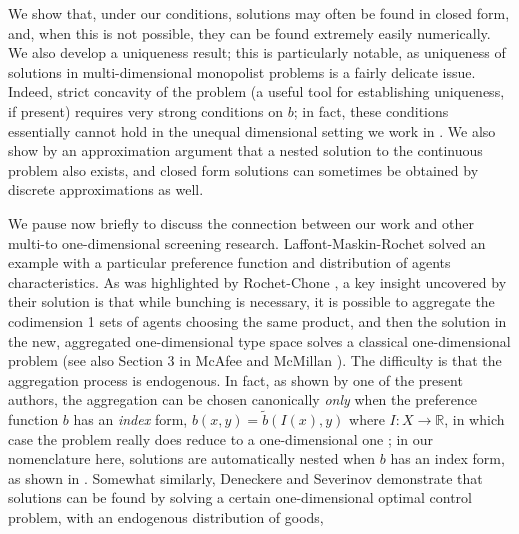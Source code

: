 \documentclass[12pt,reqno]{amsart}
\begin{document}
We show that, under our conditions, solutions may often be found in closed form, and, when this is not possible, they can be found extremely easily numerically.  We also develop a uniqueness result; this is particularly notable, as  uniqueness of solutions in multi-dimensional monopolist problems is a fairly delicate issue. Indeed, strict concavity of the problem (a useful tool for establishing uniqueness, if present) requires very strong conditions on $b$; in fact, these conditions essentially cannot hold in the unequal dimensional setting we work in \cite{Pass2012}.  We also show by an approximation argument that a nested solution to the continuous problem also exists, and closed form solutions can sometimes be obtained by discrete approximations as well.

We pause now briefly to discuss the connection between our work and other multi-to one-dimensional screening research.  Laffont-Maskin-Rochet \cite{laffont} solved an example with a particular preference function and distribution of agents characteristics. %
As was highlighted by Rochet-Chone \cite{RochetChone98}, a key insight uncovered by their solution is that while bunching is necessary, it is possible to aggregate the codimension 1 sets of agents choosing the same product, and then the solution in the new, aggregated one-dimensional type space solves a classical one-dimensional problem (see also Section 3 in McAfee and McMillan \cite{McAfee}).  The difficulty is that the aggregation process is endogenous.  In fact, as shown by one of the present authors, the aggregation can be chosen canonically \emph{only} when the preference function $b$ has an \emph{index} form, $b(x,y) = \tilde b(I(x),y)$ where $I:X \rightarrow \mathbb{R}$, in which case the problem really does reduce to a one-dimensional one \cite{Pass2012}; in our nomenclature here, solutions are automatically nested when $b$ has an index form, as shown in \cite{ChiapporiMcCannPass17}.  %
Somewhat similarly, Deneckere and Severinov \cite{Deneckere} demonstrate that solutions can be found by solving a certain one-dimensional optimal control problem, with an endogenous distribution of goods, %
\end{document}

